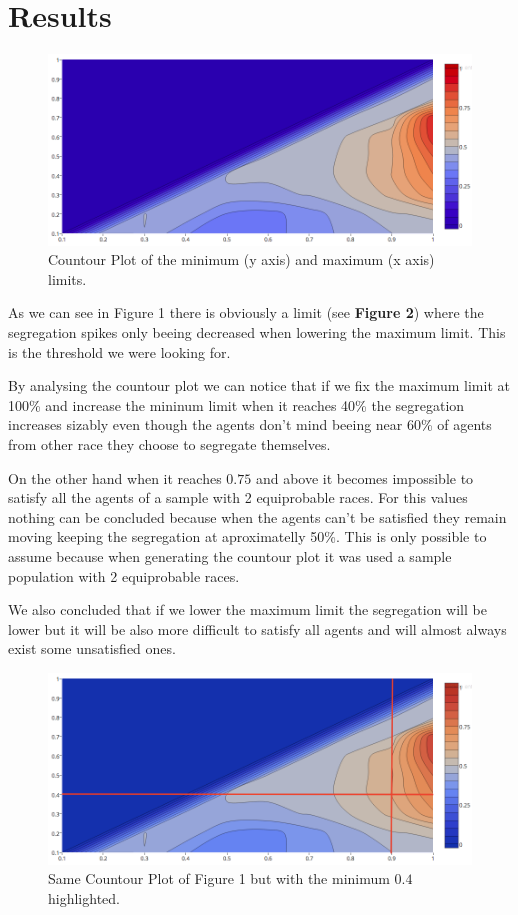 \documentclass[a4paper,titlepage,11pt]{article}
\begin{document}
\section{Results}

\begin{figure}[h]
    \centering
    \includegraphics[scale=0.40]{img/ploty.png}
    \caption{Countour Plot of the minimum (y axis) and maximum (x axis) limits.}
\end{figure}

As we can see in Figure 1 there is obviously a limit (see \textbf{Figure 2}) where the segregation spikes only beeing
decreased when lowering the maximum limit. This is the threshold we were looking for.

By analysing the countour plot we can notice that if we fix the maximum limit at 100\% and increase the mininum limit when
it reaches 40\% the segregation increases sizably even though the agents don't mind beeing near 60\% of agents from other
race they choose to segregate themselves.

On the other hand when it reaches $0.75$ and above it becomes impossible to satisfy all the agents of a sample with 2
equiprobable races. For this values nothing can be concluded because when the agents can't be satisfied they remain moving
keeping the segregation at aproximatelly 50\%. This is only possible to assume because when generating the countour plot
it was used a sample population with 2 equiprobable races.

We also concluded that if we lower the maximum limit the segregation will be lower but it will be also more difficult to
satisfy all agents and will almost always exist some unsatisfied ones.

\begin{figure}[h]
    \centering
    \includegraphics[scale=0.40]{img/ploty-a.png}
    \caption{Same Countour Plot of Figure 1 but with the minimum $0.4$ highlighted.}
\end{figure}
\end{document}
